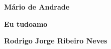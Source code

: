 \textbf{Mário de Andrade} \lipsum[1]

\textbf{Eu tudoamo} \lipsum[2]

\textbf{Rodrigo Jorge Ribeiro Neves} \lipsum[3]







